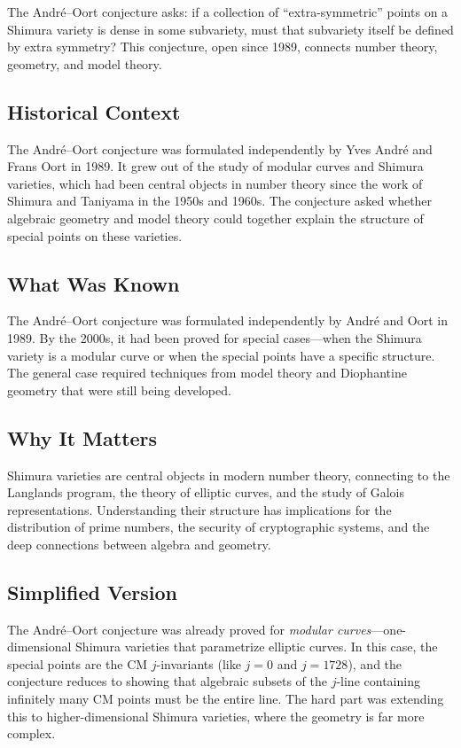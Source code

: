 The André--Oort conjecture asks: if a collection of ``extra-symmetric'' points on a Shimura variety is dense in some subvariety, must that subvariety itself be defined by extra symmetry? This conjecture, open since 1989, connects number theory, geometry, and model theory.

\subsection{Historical Context}
The André--Oort conjecture was formulated independently by Yves André and Frans Oort in 1989. It grew out of the study of modular curves and Shimura varieties, which had been central objects in number theory since the work of Shimura and Taniyama in the 1950s and 1960s. The conjecture asked whether algebraic geometry and model theory could together explain the structure of special points on these varieties.

\subsection{What Was Known}
The André--Oort conjecture was formulated independently by André and Oort in 1989. By the 2000s, it had been proved for special cases---when the Shimura variety is a modular curve or when the special points have a specific structure. The general case required techniques from model theory and Diophantine geometry that were still being developed.

\subsection{Why It Matters}
Shimura varieties are central objects in modern number theory, connecting to the Langlands program, the theory of elliptic curves, and the study of Galois representations. Understanding their structure has implications for the distribution of prime numbers, the security of cryptographic systems, and the deep connections between algebra and geometry.

\subsection{Simplified Version}
The André--Oort conjecture was already proved for \emph{modular curves}---one-dimensional Shimura varieties that parametrize elliptic curves. In this case, the special points are the CM $j$-invariants (like $j = 0$ and $j = 1728$), and the conjecture reduces to showing that algebraic subsets of the $j$-line containing infinitely many CM points must be the entire line. The hard part was extending this to higher-dimensional Shimura varieties, where the geometry is far more complex.

